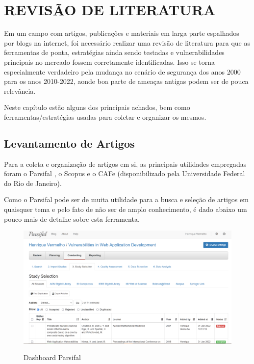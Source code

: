 \chapter{REVISÃO DE LITERATURA}
\label{chp:capitulo3}
Em um campo com artigos, publicações e materiais em larga parte espalhados por blogs na internet, foi necessário realizar uma revisão de literatura para que as ferramentas de ponta, estratégias ainda sendo testadas e vulnerabilidades principais no mercado fossem corretamente identificadas. Isso se torna especialmente verdadeiro pela mudança no cenário de segurança dos anos 2000 para os anos 2010-2022, aonde boa parte de ameaças antigas podem ser de pouca relevância.

Neste capítulo estão alguns dos principais achados, bem como ferramentas/estratégias usadas para coletar e organizar os mesmos.

\section{Levantamento de Artigos}

Para a coleta e organização de artigos em si, as principais utilidades empregadas foram o Parsifal \cite{parsifal_docs}, o Scopus e o CAFe (disponibilizado pela Universidade Federal do Rio de Janeiro). 

Como o Parsifal pode ser de muita utilidade para a busca e seleção de artigos em quaisquer tema e pelo fato de não ser de amplo conhecimento, é dado abaixo um pouco mais de detalhe sobre esta ferramenta.

\begin{figure}[ht]
    \centering
    \caption{Dashboard Parsifal}
    \includegraphics[width=14cm]{figuras/parsifal.png} 
    \label{fig:internet} 
\end{figure}

